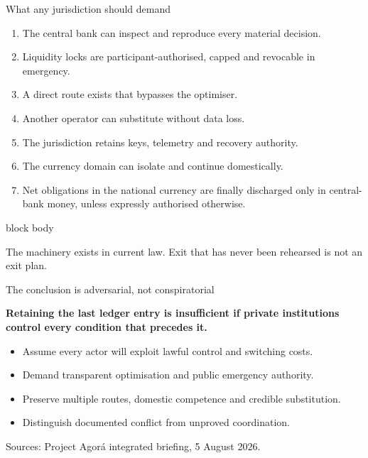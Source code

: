\documentclass[aspectratio=169,12pt]{beamer}
\newcommand{\claim}[1]{\begin{center}\fontsize{16}{19}\selectfont\bfseries #1\end{center}}
\newcommand{\source}[1]{\vfill\par\fontsize{5.4}{6.5}\selectfont\color{Quiet}Sources: #1}
\newcommand{\tightitems}{\setlength{\itemsep}{0.42em}\setlength{\parskip}{0pt}}
\newenvironment{statement}{%
  \begin{beamercolorbox}[sep=.18cm,rounded=false,wd=\linewidth]{block body}%
  \fontsize{13}{15.5}\selectfont\bfseries
}{\end{beamercolorbox}}
\begin{document}
\begin{frame}{What any jurisdiction should demand}
  \fontsize{10.3}{12.4}\selectfont
  \begin{enumerate}\tightitems
    \item The central bank can inspect and reproduce every material decision.
    \item Liquidity locks are participant-authorised, capped and revocable in emergency.
    \item A direct route exists that bypasses the optimiser.
    \item Another operator can substitute without data loss.
    \item The jurisdiction retains keys, telemetry and recovery authority.
    \item The currency domain can isolate and continue domestically.
    \item Net obligations in the national currency are finally discharged only in central-bank money, unless expressly authorised otherwise.
  \end{enumerate}
  \vspace{0.10cm}
  \begin{statement}
    The machinery exists in current law. Exit that has never been rehearsed is not an exit plan.
  \end{statement}
\end{frame}

\begin{frame}{The conclusion is adversarial, not conspiratorial}
  \claim{Retaining the last ledger entry is insufficient if private institutions control every condition that precedes it.}
  \vspace{0.30cm}
  \begin{itemize}\tightitems
    \item Assume every actor will exploit lawful control and switching costs.
    \item Demand transparent optimisation and public emergency authority.
    \item Preserve multiple routes, domestic competence and credible substitution.
    \item Distinguish documented conflict from unproved coordination.
  \end{itemize}
  \source{Project Agor\'a integrated briefing, 5 August 2026.}
\end{frame}
\end{document}
